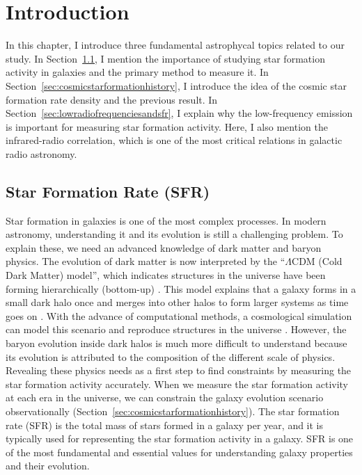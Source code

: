 \chapter{Introduction}\label{chap:introduction}
\begin{chapabstract}

In this chapter, I introduce three fundamental astrophycal topics related to our study.
In Section~\ref{sec:starformationrate}, I mention the importance of studying star formation activity in galaxies and the primary method to measure it.
In Section~\ref{sec:cosmicstarformationhistory}, I introduce the idea of the cosmic star formation rate density and the previous result.
In Section~\ref{sec:lowradiofrequenciesandsfr}, I explain why the low-frequency emission is important for measuring star formation activity.
Here, I also mention the infrared-radio correlation, which is one of the most critical relations in galactic radio astronomy.


\end{chapabstract}

\section{Star Formation Rate (SFR)}\label{sec:starformationrate}

Star formation in galaxies is one of the most complex processes.
In modern astronomy, understanding it and its evolution is still a challenging problem.
To explain these, we need an advanced knowledge of dark matter and baryon physics.
The evolution of dark matter is now interpreted by the ``$\Lambda$CDM (Cold Dark Matter) model'', which indicates structures in the universe have been forming hierarchically (bottom-up) \citep[e.g.,][]{Peebles1982}.
This model explains that a galaxy forms in a small dark halo once and merges into other halos to form larger systems as time goes on \citep{Blumenthal1984}.
With the advance of computational methods, a cosmological simulation can model this scenario and reproduce structures in the universe \citep[e.g.,][]{Navarro2000, Vale2004}.
However, the baryon evolution inside dark halos is much more difficult to understand because its evolution is attributed to the composition of the different scale of physics.
Revealing these physics needs as a first step to find constraints by measuring the star formation activity accurately.
When we measure the star formation activity at each era in the universe, we can constrain the galaxy evolution scenario observationally (Section~\ref{sec:cosmicstarformationhistory}).
The star formation rate (SFR) is the total mass of stars formed in a galaxy per year, and it is typically used for representing the star formation activity in a galaxy.
SFR is one of the most fundamental and essential values for understanding galaxy properties and their evolution.

